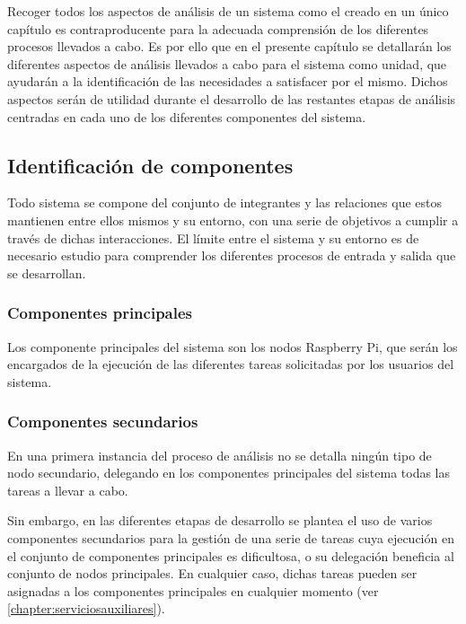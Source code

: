 Recoger todos los aspectos de análisis de un sistema como el creado en un único capítulo es contraproducente para la adecuada comprensión de los diferentes procesos llevados a cabo. Es por ello que en el presente capítulo se detallarán los diferentes aspectos de análisis llevados a cabo para el sistema como unidad, que ayudarán a la identificación de las necesidades a satisfacer por el mismo. Dichos aspectos serán de utilidad durante el desarrollo de las restantes etapas de análisis centradas en cada uno de los diferentes componentes del sistema.

\subsection{Identificación de componentes}

Todo sistema se compone del conjunto de integrantes y las relaciones que estos mantienen entre ellos mismos y su entorno, con una serie de objetivos a cumplir a través de dichas interacciones. El límite entre el sistema y su entorno es de necesario estudio para comprender los diferentes procesos de  entrada y salida que se desarrollan.

\subsubsection{Componentes principales} 

Los componente principales del sistema son los nodos Raspberry Pi, que serán los encargados de la ejecución de las diferentes tareas solicitadas por los usuarios del sistema.

\subsubsection{Componentes secundarios}

En una primera instancia del proceso de análisis no se detalla ningún tipo de nodo secundario, delegando en los componentes principales del sistema todas las tareas a llevar a cabo.

Sin embargo, en las diferentes etapas de desarrollo se plantea el uso de varios componentes secundarios para la gestión de una serie de tareas cuya ejecución en el conjunto de componentes principales es dificultosa, o su delegación beneficia al conjunto de nodos principales. En cualquier caso, dichas tareas pueden ser asignadas a los componentes principales en cualquier momento (ver \ref{chapter:serviciosauxiliares}).

